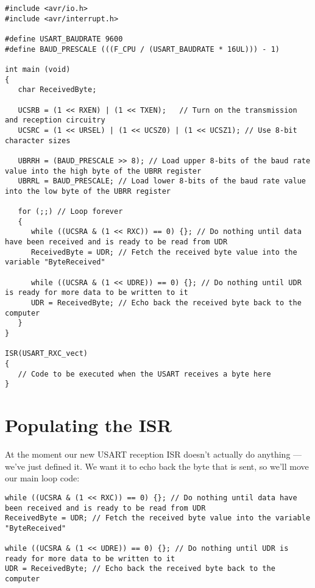 \documentclass[a4paper,oneside,notitlepage]{book}
\begin{document}
\begin{center}
\begin{lstlisting}
#include <avr/io.h>
#include <avr/interrupt.h>

#define USART_BAUDRATE 9600
#define BAUD_PRESCALE (((F_CPU / (USART_BAUDRATE * 16UL))) - 1)

int main (void)
{
   char ReceivedByte;

   UCSRB = (1 << RXEN) | (1 << TXEN);   // Turn on the transmission and reception circuitry
   UCSRC = (1 << URSEL) | (1 << UCSZ0) | (1 << UCSZ1); // Use 8-bit character sizes

   UBRRH = (BAUD_PRESCALE >> 8); // Load upper 8-bits of the baud rate value into the high byte of the UBRR register
   UBRRL = BAUD_PRESCALE; // Load lower 8-bits of the baud rate value into the low byte of the UBRR register

   for (;;) // Loop forever
   {
      while ((UCSRA & (1 << RXC)) == 0) {}; // Do nothing until data have been received and is ready to be read from UDR
      ReceivedByte = UDR; // Fetch the received byte value into the variable "ByteReceived"

      while ((UCSRA & (1 << UDRE)) == 0) {}; // Do nothing until UDR is ready for more data to be written to it
      UDR = ReceivedByte; // Echo back the received byte back to the computer
   }
}

ISR(USART_RXC_vect)
{
   // Code to be executed when the USART receives a byte here
}
\end{lstlisting}
\end{center}


\chapter{Populating the ISR}

At the moment our new USART reception ISR doesn't actually do anything --- we've just defined it. We want it to echo back the byte that is sent, so we'll move our main loop code:

\begin{center}
\begin{lstlisting}
while ((UCSRA & (1 << RXC)) == 0) {}; // Do nothing until data have been received and is ready to be read from UDR
ReceivedByte = UDR; // Fetch the received byte value into the variable "ByteReceived"

while ((UCSRA & (1 << UDRE)) == 0) {}; // Do nothing until UDR is ready for more data to be written to it
UDR = ReceivedByte; // Echo back the received byte back to the computer
\end{lstlisting}
\end{center}
\end{document}
